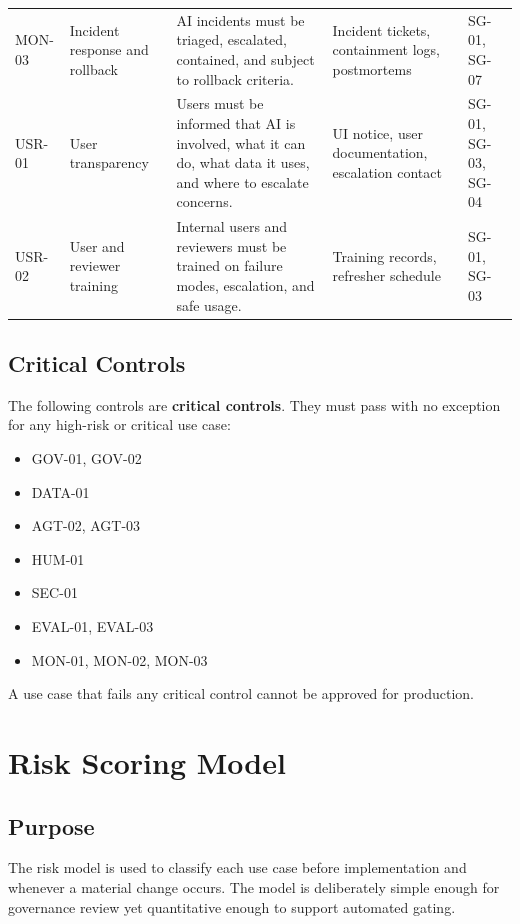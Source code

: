 \documentclass[11pt,a4paper]{article}
\begin{document}
\begin{longtable}{P{0.10\textwidth}P{0.21\textwidth}P{0.23\textwidth}P{0.18\textwidth}P{0.18\textwidth}}
MON-03 & Incident response and rollback & AI incidents must be triaged, escalated, contained, and subject to rollback criteria. & Incident tickets, containment logs, postmortems & SG-01, SG-07 \\
USR-01 & User transparency & Users must be informed that AI is involved, what it can do, what data it uses, and where to escalate concerns. & UI notice, user documentation, escalation contact & SG-01, SG-03, SG-04 \\
USR-02 & User and reviewer training & Internal users and reviewers must be trained on failure modes, escalation, and safe usage. & Training records, refresher schedule & SG-01, SG-03 \\
\bottomrule
\end{longtable}

\subsection{Critical Controls}

The following controls are \textbf{critical controls}. They must pass with no exception for any high-risk or critical use case:

\begin{itemize}[nosep]
    \item GOV-01, GOV-02
    \item DATA-01
    \item AGT-02, AGT-03
    \item HUM-01
    \item SEC-01
    \item EVAL-01, EVAL-03
    \item MON-01, MON-02, MON-03
\end{itemize}

A use case that fails any critical control cannot be approved for production.

\section{Risk Scoring Model}

\subsection{Purpose}

The risk model is used to classify each use case before implementation and whenever a material change occurs. The model is deliberately simple enough for governance review yet quantitative enough to support automated gating.
\end{document}
